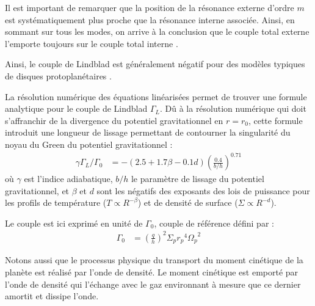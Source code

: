 \bigskip

Il est important de remarquer que la position de la résonance externe d'ordre $m$ est systématiquement plus proche que la résonance interne associée. Ainsi, en sommant sur tous les modes, on arrive à la conclusion que le couple total externe l'emporte toujours sur le couple total interne \citep{ward1997protoplanet}. 

Ainsi, le couple de Lindblad est généralement négatif pour des modèles typiques de disques protoplanétaires \citep{ward1997protoplanet}.

La résolution numérique des équations linéarisées permet de trouver une formule analytique pour le couple de Lindblad $\Gamma_L$. Dû à la résolution numérique qui doit s'affranchir de la divergence du potentiel gravitationnel en $r=r_0$, cette formule introduit une longueur de lissage permettant de contourner la singularité du noyau du Green du potentiel gravitationnel \citep[eq. (14)]{paardekooper2010torque} : 
\begin{align}
\gamma \Gamma_L/\Gamma_0 &= - \left(2.5 +1.7\beta -0.1d\right) \left(\frac{0.4}{b/h}\right)^{0.71}\label{eq:lindblad-torque}
\end{align}
où $\gamma$ est l'indice adiabatique, $b/h$ le paramètre de lissage du potentiel gravitationnel, et $\beta$ et $d$ sont les négatifs des exposants des lois de puissance pour les profils de température ($T \propto R^{-\beta}$) et de densité de surface ($\Sigma \propto R^{-d}$). 

Le couple est ici exprimé en unité de $\Gamma_0$, couple de référence défini par : 
\begin{align}
\Gamma_0 &= \left(\frac{q}{h}\right)^2\Sigma_p {r_p}^4 {\Omega_p}^2
\end{align}

Notons aussi que le processus physique du transport du moment cinétique de la planète est réalisé par l'onde de densité. Le
moment cinétique est emporté par l'onde de densité qui l'échange avec le gaz environnant à mesure que ce dernier amortit et
dissipe l'onde.

